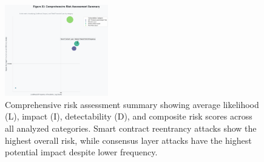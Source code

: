 





\begin{figure}[H]
\centering
\includegraphics[width=0.4\textwidth]{../figure/Fig11.png}
\caption{Comprehensive risk assessment summary showing average likelihood (L), impact (I), detectability (D), and composite risk scores across all analyzed categories. Smart contract reentrancy attacks show the highest overall risk, while consensus layer attacks have the highest potential impact despite lower frequency.}
\label{fig:risk_scores_summary}
\end{figure}

